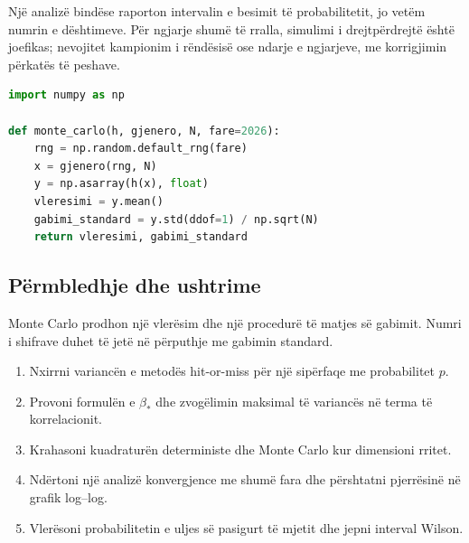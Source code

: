 Një analizë bindëse raporton intervalin e besimit të probabilitetit, jo vetëm numrin e dështimeve. Për ngjarje shumë të rralla, simulimi i drejtpërdrejtë është joefikas; nevojitet kampionim i rëndësisë ose ndarje e ngjarjeve, me korrigjimin përkatës të peshave.

\begin{lstlisting}[language=Python,caption={Vlerësues Monte Carlo me gabim standard.}]
import numpy as np

def monte_carlo(h, gjenero, N, fare=2026):
    rng = np.random.default_rng(fare)
    x = gjenero(rng, N)
    y = np.asarray(h(x), float)
    vleresimi = y.mean()
    gabimi_standard = y.std(ddof=1) / np.sqrt(N)
    return vleresimi, gabimi_standard
\end{lstlisting}

\subsection{Përmbledhje dhe ushtrime}
Monte Carlo prodhon një vlerësim dhe një procedurë të matjes së gabimit. Numri i shifrave duhet të jetë në përputhje me gabimin standard.
\begin{enumerate}
\item Nxirrni variancën e metodës hit-or-miss për një sipërfaqe me probabilitet $p$.
\item Provoni formulën e $\beta_*$ dhe zvogëlimin maksimal të variancës në terma të korrelacionit.
\item Krahasoni kuadraturën deterministe dhe Monte Carlo kur dimensioni rritet.
\item Ndërtoni një analizë konvergjence me shumë fara dhe përshtatni pjerrësinë në grafik log--log.
\item Vlerësoni probabilitetin e uljes së pasigurt të mjetit dhe jepni interval Wilson.
\end{enumerate}
